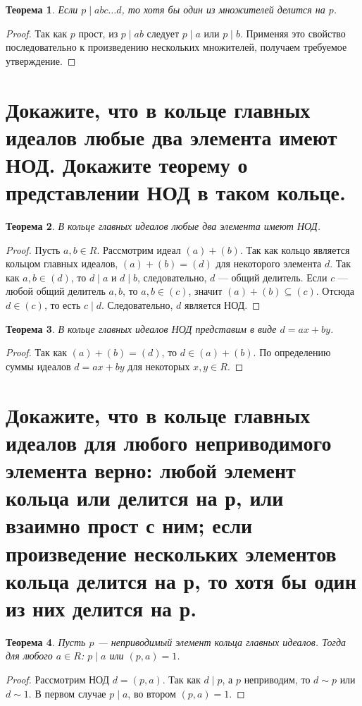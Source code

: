 \documentclass[12pt, a4paper]{article}
\theoremstyle{definition}
\theoremstyle{plain}
\newtheorem{theorem}{Теорема}[section]
\begin{document}
	\begin{theorem}
		Если $p \mid abc\dots d$, то хотя бы один из множителей делится на $p$.
	\end{theorem}
	\begin{proof}
		Так как $p$ прост, из $p \mid ab$ следует $p \mid a$ или $p \mid b$. Применяя это свойство последовательно к произведению нескольких множителей, получаем требуемое утверждение.
	\end{proof}
	
	\newpage
	\section{Докажите, что в кольце главных идеалов любые два элемента имеют НОД. Докажите теорему о представлении НОД в таком кольце.}
	
	\begin{theorem}
		В кольце главных идеалов любые два элемента имеют НОД.
	\end{theorem}
	\begin{proof}
		Пусть $a,b \in R$. Рассмотрим идеал $(a)+(b)$. Так как кольцо является кольцом главных идеалов, $(a)+(b)=(d)$ для некоторого элемента $d$. Так как $a,b \in (d)$, то $d \mid a$ и $d \mid b$, следовательно, $d$ — общий делитель.
		Если $c$ — любой общий делитель $a, b$, то $a,b \in (c)$, значит $(a)+(b) \subseteq (c)$. Отсюда $d \in (c)$, то есть $c \mid d$. Следовательно, $d$ является НОД.
	\end{proof}
	
	\begin{theorem}
		В кольце главных идеалов НОД представим в виде $d = ax+by$.
	\end{theorem}
	\begin{proof}
		Так как $(a)+(b)=(d)$, то $d \in (a)+(b)$. По определению суммы идеалов $d=ax+by$ для некоторых $x,y \in R$.
	\end{proof}
	
	\newpage
	\section{Докажите, что в кольце главных идеалов для любого неприводимого элемента верно: любой элемент кольца или делится на р, или взаимно прост с ним; если произведение нескольких элементов кольца делится на р, то хотя бы один из них делится на р.}
	
	\begin{theorem}
		Пусть $p$ — неприводимый элемент кольца главных идеалов. Тогда для любого $a \in R$: $p \mid a$ или $(p,a)=1$.
	\end{theorem}
	\begin{proof}
		Рассмотрим НОД $d=(p,a)$. Так как $d \mid p$, а $p$ неприводим, то $d \sim p$ или $d \sim 1$. В первом случае $p \mid a$, во втором $(p,a)=1$.
	\end{proof}
	
\end{document}
